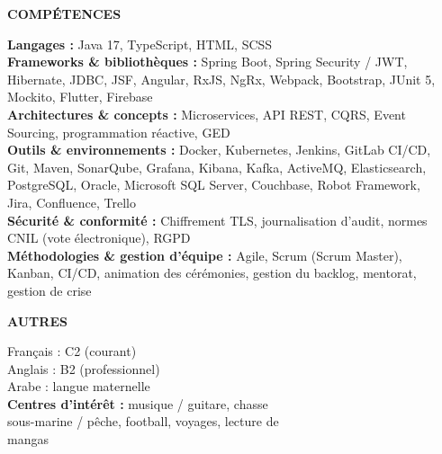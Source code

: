 \documentclass[a4paper,10pt]{article}
\newcommand{\dcsection}[1]{%
  \par\vspace{0.2mm}%
  {\fontsize{16}{19}\selectfont\bfseries\color{dcgold}\MakeUppercase{#1}}\par
  \vspace{2.8mm}%
}
\begin{document}
\noindent
\begin{minipage}[t]{0.575\textwidth}
\dcsection{Compétences}
\vspace{-1.5mm}
{\fontsize{8.4}{10.5}\selectfont
\noindent\textbf{Langages :} Java 17, TypeScript, HTML, SCSS\\[0.4mm]
\noindent\textbf{Frameworks \& bibliothèques :} Spring Boot, Spring Security / JWT,\\
Hibernate, JDBC, JSF, Angular, RxJS, NgRx, Webpack, Bootstrap, JUnit 5,\\
Mockito, Flutter, Firebase\\[0.4mm]
\noindent\textbf{Architectures \& concepts :} Microservices, API REST, CQRS, Event\\
Sourcing, programmation réactive, GED\\[0.4mm]
\noindent\textbf{Outils \& environnements :} Docker, Kubernetes, Jenkins, GitLab CI/CD,\\
Git, Maven, SonarQube, Grafana, Kibana, Kafka, ActiveMQ, Elasticsearch,\\
PostgreSQL, Oracle, Microsoft SQL Server, Couchbase, Robot Framework,\\
Jira, Confluence, Trello\\[0.4mm]
\noindent\textbf{Sécurité \& conformité :} Chiffrement TLS, journalisation d'audit, normes\\
CNIL (vote électronique), RGPD\\[0.4mm]
\noindent\textbf{Méthodologies \& gestion d'équipe :} Agile, Scrum (Scrum Master),\\
Kanban, CI/CD, animation des cérémonies, gestion du backlog, mentorat,\\
gestion de crise\par}
\end{minipage}%
\hfill
\begin{minipage}[t]{0.38\textwidth}
\dcsection{Autres}
\vspace{-1.5mm}
{\fontsize{8.4}{10.5}\selectfont
\noindent Français : C2 (courant)\\[0.4mm]
\noindent Anglais : B2 (professionnel)\\[0.4mm]
\noindent Arabe : langue maternelle\\[1.3mm]
\noindent\textbf{Centres d'intérêt :} musique / guitare, chasse\\
sous-marine / pêche, football, voyages, lecture de\\
mangas\par}
\end{minipage}
\end{document}
